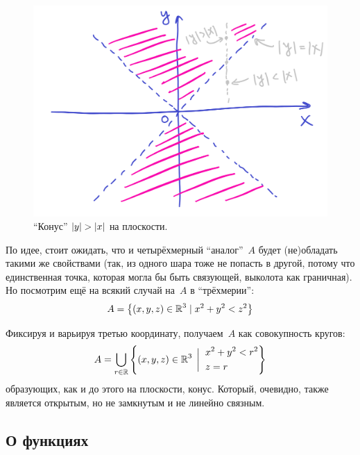 \documentclass[a4paper,12pt]{article}
\newcommand{\BigMiddleTwo}{\;\left|\vphantom{\begin{pmatrix} 0\\0 \end{pmatrix}}\right.\;}
\begin{document}
\begin{solution}
    \begin{figure}[ht]
      \centering
  
      \includegraphics[width=0.8\columnwidth]{cone-on-plane}
  
      \caption{
        ``Конус'' $|y| \hm> |x|$ на плоскости.
      }
      \label{fig:cone-on-plane}
    \end{figure}

    По идее, стоит ожидать, что и четырёхмерный ``аналог''~$A$ будет (не)обладать такими же свойствами (так, из одного шара тоже не попасть в другой, потому что единственная точка, которая могла бы быть связующей, выколота как граничная).
    Но посмотрим ещё на всякий случай на~$A$ в ``трёхмерии'':
    \[
      A = \bigl\{
        (x, y, z) \in \operatorname{\mathbb R}^3 \mid x^2 + y^2 < z^2
      \bigr\}
    \]

    Фиксируя и варьируя третью координату, получаем~$A$ как совокупность кругов:
    \[
      A = \bigcup_{r \in \RR} \left\{
        (x, y, z) \in \RR^3 \BigMiddleTwo %
          \begin{aligned}
            &x^2 + y^2 < r^2\\
            &z = r
          \end{aligned}
      \right\}
    \]
    образующих, как и до этого на плоскости, конус.
    Который, очевидно, также является открытым, но не замкнутым и не линейно связным.

  \end{solution}


  \subsection{О функциях}
  
\end{document}
